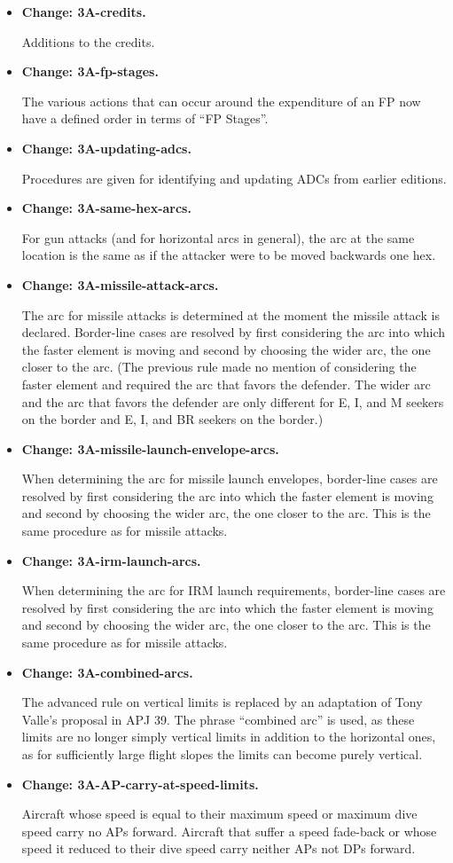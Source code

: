 \documentclass[10pt]{report}
\newcommand{\itemtag}[1]{\item \textbf{Change: #1.}\par}
\begin{document}
\begin{itemize}
    \itemtag{3A-credits} Additions to the credits.
    
    \itemtag{3A-fp-stages} The various actions that can occur around the expenditure of an FP now have a defined order in terms of “FP Stages”.
    
    \itemtag{3A-updating-adcs} Procedures are given for identifying and updating ADCs from earlier editions.
    
    \itemtag{3A-same-hex-arcs} For gun attacks (and for horizontal arcs in general), the arc at the same location is the same as if the attacker were to be moved backwards one hex.
    
    \itemtag{3A-missile-attack-arcs} The arc for missile attacks is determined at the moment the missile attack is declared. Border-line cases are resolved by first considering the arc into which the faster element is moving and second by choosing the wider arc, the one closer to the  arc. (The previous rule made no mention of considering the faster element and required the arc that favors the defender. The wider arc and the arc that favors the defender are only different for E, I, and M seekers on the  border and E, I, and BR seekers on the  border.)

    \itemtag{3A-missile-launch-envelope-arcs} When determining the arc for missile launch envelopes, border-line cases are resolved by first considering the arc into which the faster element is moving and second by choosing the wider arc, the one closer to the  arc. This is the same procedure as for missile attacks.    

    \itemtag{3A-irm-launch-arcs} When determining the arc for IRM launch requirements, border-line cases are resolved by first considering the arc into which the faster element is moving and second by choosing the wider arc, the one closer to the  arc. This is the same procedure as for missile attacks.    

    \itemtag{3A-combined-arcs} The advanced rule on vertical limits is replaced by an adaptation of Tony Valle's proposal in APJ 39. The phrase “combined arc” is used, as these limits are no longer simply vertical limits in addition to the horizontal ones, as for sufficiently large flight slopes the limits can become purely vertical.

    \itemtag{3A-AP-carry-at-speed-limits} Aircraft whose speed is equal to their maximum speed or maximum dive speed carry no APs forward. Aircraft that suffer a speed fade-back or whose speed it reduced to their dive speed carry neither APs not DPs forward.


\end{itemize}
\end{document}
